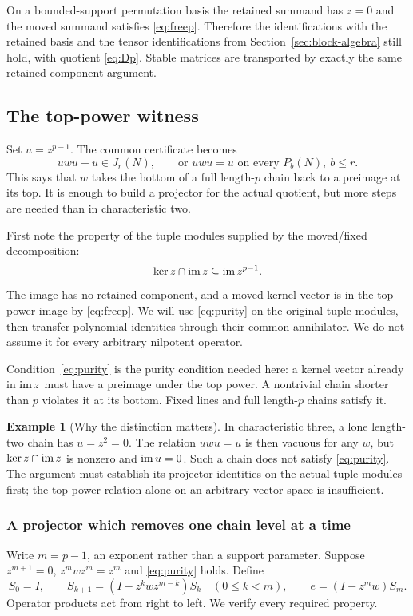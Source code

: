 \documentclass[11pt,a4paper]{article}
\theoremstyle{definition}\newtheorem{definition}[theorem]{Definition}
\newtheorem{example}[theorem]{Example}
\theoremstyle{remark}\newtheorem{remark}[theorem]{Remark}
\begin{document}
On a bounded-support permutation basis the retained summand has $z=0$ and the moved summand satisfies \eqref{eq:freep}. Therefore the identifications with the retained basis and the tensor identifications from Section~\ref{sec:block-algebra} still hold, with quotient \eqref{eq:Dp}. Stable matrices are transported by exactly the same retained-component argument.

\subsection{The top-power witness}\label{sec:topwitness}
Set $u=z^{p-1}$. The common certificate becomes
\begin{equation}\label{eq:topwitness}uwu-u\in J_r(N),\qquad\text{or }uwu=u\text{ on every }P_b(N),\ b\le r.
\end{equation}
This says that $w$ takes the bottom of a full length-$p$ chain back to a preimage at its top. It is enough to build a projector for the actual quotient, but more steps are needed than in characteristic two.

First note the property of the tuple modules supplied by the moved/fixed decomposition:
\begin{equation}\label{eq:purity}\ker z\cap\operatorname{im} z\subseteq\operatorname{im} z^{p-1}.
\end{equation}
The image has no retained component, and a moved kernel vector is in the top-power image by \eqref{eq:freep}. We will use \eqref{eq:purity} on the original tuple modules, then transfer polynomial identities through their common annihilator. We do not assume it for every arbitrary nilpotent operator.

Condition~\eqref{eq:purity} is the purity condition needed here: a
kernel vector already in $\operatorname{im} z$ must have a preimage under the top
power. A nontrivial chain shorter than $p$ violates it at its bottom.
Fixed lines and full length-$p$ chains satisfy it.

\begin{example}[Why the distinction matters]
In characteristic three, a lone length-two chain has $u=z^2=0$. The relation $uwu=u$ is then vacuous for any $w$, but $\ker z\cap\operatorname{im} z$ is nonzero and $\operatorname{im} u=0$. Such a chain does not satisfy \eqref{eq:purity}. The argument must establish its projector identities on the actual tuple modules first; the top-power relation alone on an arbitrary vector space is insufficient.
\end{example}

\subsubsection{A projector which removes one chain level at a time}
Write $m=p-1$, an exponent rather than a support parameter. Suppose $z^{m+1}=0$, $z^mwz^m=z^m$ and \eqref{eq:purity} holds. Define
\begin{equation}\label{eq:projectorp}
S_0=I,\qquad S_{k+1}=(I-z^kwz^{m-k})S_k\quad(0\le k<m),
\qquad e=(I-z^mw)S_m.
\end{equation}
Operator products act from right to left. We verify every required property.
\end{document}
